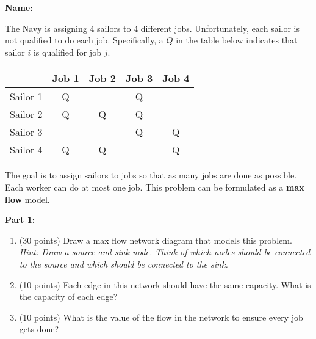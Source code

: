 \documentclass[letterpaper,oneside,12pt]{article}%
\begin{document}
\noindent{}

\vspace{3mm} \hspace{\fill} \textbf{Name: \underline{\hspace{6cm}}}

The Navy is assigning 4 sailors to 4 different jobs. Unfortunately, each sailor is not qualified to do each job. Specifically, a $Q$ in the table below indicates that sailor $i$ is qualified for job $j$.

\begin{center}
\begin{tabular}{c|cccc} 
\hline 
           & Job 1 & Job 2 & Job 3 & Job 4  \\ \hline
Sailor 1   &  Q    &       & Q     &        \\ 
Sailor 2   & Q     & Q     & Q     &        \\ 
Sailor 3   &       &       & Q     & Q      \\
Sailor 4   & Q     & Q     &       & Q      \\  \hline 
\end{tabular}
\end{center}

The goal is to assign sailors to jobs so that as many jobs are done as possible. Each worker can do at most one job. This problem can be formulated as a \textbf{max flow} model.

\textbf{Part 1:}

\begin{enumerate}
\item (30 points) Draw a max flow network diagram that models this problem. \emph{Hint: Draw a source and sink node. Think of which nodes should be connected to the source and which should be connected to the sink.} \vfill

\item (10 points) Each edge in this network should have the same capacity. What is the capacity of each edge? \vspace{0.5in}
\item (10 points) What is the value of the flow in the network to ensure every job gets done? \vspace{1in}
\end{enumerate}
\newpage
\end{document}
